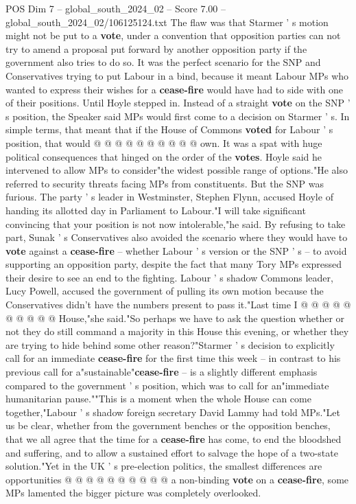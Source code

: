 \begin{textsample}{POS Dim 7 – global\_south\_2024\_02 – Score 7.00 – global\_south\_2024\_02/106125124.txt}
The flaw was that Starmer ' s motion might not be put to a \textbf{vote}, under a convention that opposition parties can not try to amend a proposal put forward by another opposition party if the government also tries to do so.
It was the perfect scenario for the SNP and Conservatives trying to put Labour in a bind, because it meant Labour MPs who wanted to express their wishes for a \textbf{cease-fire} would have had to side with one of their positions.
Until Hoyle stepped in.
Instead of a straight \textbf{vote} on the SNP ' s position, the Speaker said MPs would first come to a decision on Starmer ' s.
In simple terms, that meant that if the House of Commons \textbf{voted} for Labour ' s position, that would @ @ @ @ @ @ @ @ @ @ own.
It was a spat with huge political consequences that hinged on the order of the \textbf{votes}.
Hoyle said he intervened to allow MPs to consider"the widest possible range of options."He also referred to security threats facing MPs from constituents.
But the SNP was furious.
The party ' s leader in Westminster, Stephen Flynn, accused Hoyle of handing its allotted day in Parliament to Labour."I will take significant convincing that your position is not now intolerable,"he said.
By refusing to take part, Sunak ' s Conservatives also avoided the scenario where they would have to \textbf{vote} against a \textbf{cease-fire} -- whether Labour ' s version or the SNP ' s -- to avoid supporting an opposition party, despite the fact that many Tory MPs expressed their desire to see an end to the fighting.
Labour ' s shadow Commons leader, Lucy Powell, accused the government of pulling its own motion because the Conservatives didn't have the numbers present to pass it."Last time I @ @ @ @ @ @ @ @ @ @ House,"she said."So perhaps we have to ask the question whether or not they do still command a majority in this House this evening, or whether they are trying to hide behind some other reason?"Starmer ' s decision to explicitly call for an immediate \textbf{cease-fire} for the first time this week -- in contrast to his previous call for a"sustainable"\textbf{cease-fire} -- is a slightly different emphasis compared to the government ' s position, which was to call for an"immediate humanitarian pause.""This is a moment when the whole House can come together,"Labour ' s shadow foreign secretary David Lammy had told MPs."Let us be clear, whether from the government benches or the opposition benches, that we all agree that the time for a \textbf{cease-fire} has come, to end the bloodshed and suffering, and to allow a sustained effort to salvage the hope of a two-state solution."Yet in the UK ' s pre-election politics, the smallest differences are opportunities @ @ @ @ @ @ @ @ @ @ a non-binding \textbf{vote} on a \textbf{cease-fire}, some MPs lamented the bigger picture was completely overlooked.

\end{textsample}
